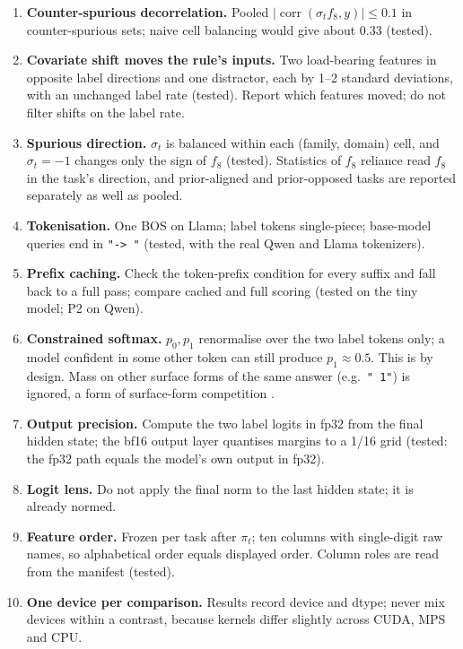 \documentclass[11pt,a4paper]{article}
\newcommand{\1}{\mathbf{1}}
\DeclareMathOperator{\corr}{corr}
\theoremstyle{plain}
\theoremstyle{definition}
\theoremstyle{remark}
\begin{document}
\begin{enumerate}
        $k/2$ labels of each class (tested).
  \item \textbf{Counter-spurious decorrelation.} Pooled
        $|\corr(\sigma_t f_8, y)| \leq 0.1$ in counter-spurious sets; naive cell
        balancing would give about $0.33$ (tested).
  \item \textbf{Covariate shift moves the rule's inputs.} Two
        load-bearing features in opposite label directions and one
        distractor, each by 1--2 standard deviations, with an unchanged
        label rate (tested). Report which features moved; do not filter
        shifts on the label rate.
  \item \textbf{Spurious direction.} $\sigma_t$ is balanced within each
        (family, domain) cell, and $\sigma_t = -1$ changes only the sign of
        $f_8$ (tested). Statistics of $f_8$ reliance read $f_8$ in the
        task's direction, and prior-aligned and prior-opposed tasks are
        reported separately as well as pooled.
  \item \textbf{Tokenisation.} One BOS on Llama; label tokens
        single-piece; base-model queries end in \texttt{"-> "} (tested, with the real Qwen and Llama tokenizers).
  \item \textbf{Prefix caching.} Check the token-prefix condition for every
        suffix and fall back to a full pass; compare cached and full scoring
        (tested on the tiny model; P2 on Qwen).
  \item \textbf{Constrained softmax.} $p_0, p_1$ renormalise over the two
        label tokens only; a model confident in some other token can still
        produce $p_1 \approx 0.5$. This is by design. Mass on other surface
        forms of the same answer (e.g.\ \texttt{" 1"}) is ignored, a form of
        surface-form competition \citep{holtzman2021surface}.
  \item \textbf{Output precision.} Compute the two label logits in fp32 from
        the final hidden state; the bf16 output layer quantises margins to a
        1/16 grid (tested: the fp32 path equals the model's own output in
        fp32).
  \item \textbf{Logit lens.} Do not apply the final norm to the last hidden
        state; it is already normed.
  \item \textbf{Feature order.} Frozen per task after $\pi_t$; ten columns
        with single-digit raw names, so alphabetical order equals displayed
        order. Column roles are read from the manifest (tested).
  \item \textbf{One device per comparison.} Results record device and dtype;
        never mix devices within a contrast, because kernels differ slightly
        across CUDA, MPS and CPU.
\end{enumerate}
\end{document}
